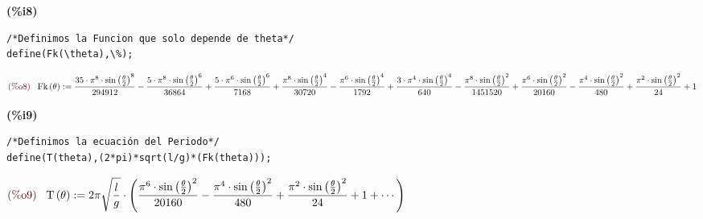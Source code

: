 \documentclass[12pt]{article}
\begin{document}
\noindent
\begin{minipage}[t]{8ex}\color{red}\bf
(\%i8) 
\end{minipage}
\begin{minipage}[t]{\textwidth}\color{blue}
\begin{verbatim}
/*Definimos la Funcion que solo depende de theta*/
define(Fk(\theta),\%);
\end{verbatim}
\end{minipage}
\begin{math}
\displaystyle
\parbox{8ex}{\color{labelcolor}(\%o8) }
\mathrm{Fk}\left( \theta\right) :=\frac{35\cdot {{\pi}^{8}}\cdot {{\mathrm{sin}\left( \frac{\theta}{2}\right) }^{8}}}{294912}-\frac{5\cdot {{\pi}^{8}}\cdot {{\mathrm{sin}\left( \frac{\theta}{2}\right) }^{6}}}{36864}+\frac{5\cdot {{\pi}^{6}}\cdot {{\mathrm{sin}\left( \frac{\theta}{2}\right) }^{6}}}{7168}+\frac{{{\pi}^{8}}\cdot {{\mathrm{sin}\left( \frac{\theta}{2}\right) }^{4}}}{30720}-\frac{{{\pi}^{6}}\cdot {{\mathrm{sin}\left( \frac{\theta}{2}\right) }^{4}}}{1792}+\frac{3\cdot {{\pi}^{4}}\cdot {{\mathrm{sin}\left( \frac{\theta}{2}\right) }^{4}}}{640}-\frac{{{\pi}^{8}}\cdot {{\mathrm{sin}\left( \frac{\theta}{2}\right) }^{2}}}{1451520}+\frac{{{\pi}^{6}}\cdot {{\mathrm{sin}\left( \frac{\theta}{2}\right) }^{2}}}{20160}-\frac{{{\pi}^{4}}\cdot {{\mathrm{sin}\left( \frac{\theta}{2}\right) }^{2}}}{480}+\frac{{{\pi}^{2}}\cdot {{\mathrm{sin}\left( \frac{\theta}{2}\right) }^{2}}}{24}+1\mbox{}
\end{math}

\noindent
\begin{minipage}[t]{8ex}\color{red}\bf
(\%i9) 
\end{minipage}
\begin{minipage}[t]{\textwidth}\color{blue}
\begin{verbatim}
/*Definimos la ecuación del Periodo*/
define(T(theta),(2*pi)*sqrt(l/g)*(Fk(theta)));
\end{verbatim}
\end{minipage}
\begin{math}
\displaystyle
\parbox{8ex}{\color{labelcolor}(\%o9) }
\mathrm{T}\left( \theta\right) :=2\pi\sqrt{\frac{l}{g}}\cdot \left(\frac{{{\pi}^{6}}\cdot {{\mathrm{sin}\left( \frac{\theta}{2}\right) }^{2}}}{20160}-\frac{{{\pi}^{4}}\cdot {{\mathrm{sin}\left( \frac{\theta}{2}\right) }^{2}}}{480}+\frac{{{\pi}^{2}}\cdot {{\mathrm{sin}\left( \frac{\theta}{2}\right) }^{2}}}{24}+1+\cdots\right) 
\end{math}
\end{document}
